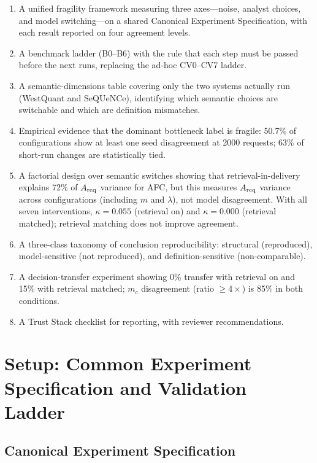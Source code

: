 \documentclass[aps,prapplied,reprint,superscriptaddress]{revtex4-2}
\begin{document}
\begin{enumerate}[leftmargin=2em]
\item A unified fragility framework measuring three axes---noise, analyst choices, and model switching---on a shared Canonical Experiment Specification, with each result reported on four agreement levels.
\item A benchmark ladder (B0--B6) with the rule that each step must be passed before the next runs, replacing the ad-hoc CV0--CV7 ladder.
\item A semantic-dimensions table covering only the two systems actually run (WestQuant and SeQUeNCe), identifying which semantic choices are switchable and which are definition mismatches.
\item Empirical evidence that the dominant bottleneck label is fragile: 50.7\% of configurations show at least one seed disagreement at 2000 requests; 63\% of short-run changes are statistically tied.
\item A factorial design over semantic switches showing that retrieval-in-delivery explains 72\% of $A_{\rm req}$ variance for AFC, but this measures $A_{\rm req}$ variance across configurations (including $m$ and $\lambda$), not model disagreement. With all seven interventions, $\kappa = 0.055$ (retrieval on) and $\kappa = 0.000$ (retrieval matched); retrieval matching does not improve agreement.
\item A three-class taxonomy of conclusion reproducibility: structural (reproduced), model-sensitive (not reproduced), and definition-sensitive (non-comparable).
\item A decision-transfer experiment showing 0\% transfer with retrieval on and 15\% with retrieval matched; $m_c$ disagreement (ratio $\geq 4\times$) is 85\% in both conditions.
\item A Trust Stack checklist for reporting, with reviewer recommendations.
\end{enumerate}

\section{Setup: Common Experiment Specification and Validation Ladder}
\label{sec:setup}

\subsection{Canonical Experiment Specification}
\end{document}
